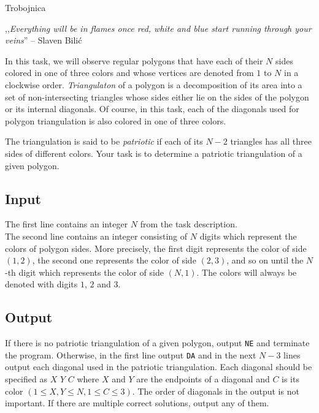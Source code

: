 \begin{statement}[
  problempoints=110,
  timelimit=1 second,
  memorylimit=512 MiB,
]{Trobojnica}



,,\textit{Everything will be in flames once red, white and blue start running through your veins}''
-- Slaven Bilić

In this task, we will observe regular polygons that have each of their $N$ sides
colored in one of three colors and whose vertices are denoted from $1$ to $N$
in a clockwise order. \textit{Triangulaton} of a polygon is a decomposition of
its area into a set of non-intersecting triangles whose sides either lie on the
sides of the polygon or its internal diagonals. Of course, in this task, each of
the diagonals used for polygon triangulation is also colored in one of three
colors.

The triangulation is said to be \textit{patriotic} if each of its $N-2$
triangles has all three sides of different colors. Your task is to determine
a patriotic triangulation of a given polygon.

\subsection*{Input}
The first line contains an integer $N$ from the task description. \\
The second line contains an integer consisting of $N$ digits which represent
the colors of polygon sides. More precisely, the first digit represents
the color of side $(1,2)$, the second one represents the color of side $(2,3)$,
and so on until the $N$-th digit which represents the color of side $(N,1)$. The
colors will always be denoted with digits $1$, $2$ and $3$.

\subsection*{Output}
If there is no patriotic triangulation of a given polygon, output \texttt{NE}
and terminate the program. Otherwise, in the first line output \texttt{DA}
and in the next $N-3$ lines output each diagonal used in the patriotic
triangulation. Each diagonal should be specified as $X$ $Y$ $C$ where $X$ and
$Y$ are the endpoints of a diagonal and $C$ is its color
$(1 \le X, Y \le N, 1 \le C \le 3)$. The order of diagonals in the output is
not important. If there are multiple correct solutions, output any of them.


\end{statement}
